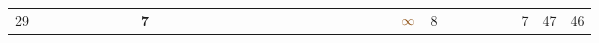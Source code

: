 \begin{landscape}
\begin{table}
\begin{adjustwidth}{-2.6cm}{}
{\begin{tabular}{l|lllllllllllllllllllllllllllllllll|ll}
		29   &            &                                                                 &                                                                 &                                                                 &                                                                 &                                                                 &                                                                 & \textbf{7}                                                      &                                                                 &                                                                 &                                                                 &                                                                 &                                                                 &                                                                 &                                                                 &                                                                 &                                                                 &                                                                 &                                                                 &                                                                 &                                                                 &                                                                 &                                                                 &                                                                 &                                                                 & $\textcolor[rgb]{0.541,0.29,0.043}{\infty}$ & 8                                                               &                                                                 &                                                                 &                                                                 &                                                                 &                                                                 & 7                                                               & 47         & 46          \\

\end{tabular}}
\end{adjustwidth}
\end{table}
\end{landscape}
